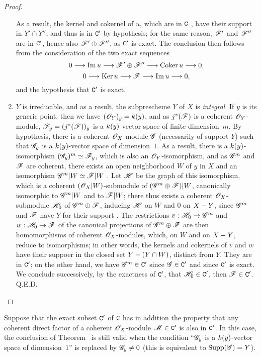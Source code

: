 \begin{proof}
\begin{enumerate}[label=(\alph*)]
    As a result, the kernel and cokernel of $u$, which are in $\mathtt{C}$ , have their support in $Y'\cap Y''$, and thus is in $\mathtt{C}'$ by hypothesis; for the same reason, $\mathscr{F}'$ and $\mathscr{F}''$ are in $\mathtt{C}'$, hence also $\mathscr{F}'\oplus\mathscr{F}''$, as $\mathtt{C}'$ is exact.
    The conclusion then follows from the consideration of the two exact sequences
    \[
      0\to\Im u\to\sh{F}'\oplus\sh{F}''\to\Coker u\to 0,
    \]
    \[
      0\to\Ker u\to\sh{F}\to\Im u\to 0,
    \]
    and the hypothesis that $\mathtt{C}'$ is exact.
  \item $Y$ is irreducible, and as a result, the subprescheme $Y$ of $X$ is \emph{integral}.
    If $y$ is its generic point, then we have $(\mathscr{O}_Y)_y=k(y)$, and as $j^*(\mathscr{F})$ is a coherent $\mathscr{O}_Y$-module, $\mathscr{F}_y=(j^*(\mathscr{F}))_y$ is a $k(y)$-vector space of finite dimension~$m$.
    By hypothesis, there is a coherent $\mathscr{O}_X$-module $\mathscr{G}$ (necessarily of support $Y$) such that $\mathscr{G}_y$ is a $k(y)$-vector space of dimension~$1$.
    As a result, there is a $k(y)$-isomorphism $(\mathscr{G}_y)^m\simeq\mathscr{F}_y$, which is also an $\mathscr{O}_Y$-isomorphism, and as $\mathscr{G}^m$ and $\mathscr{F}$ are coherent, there exists an open neighborhood $W$ of $y$ in $X$ and an isomorphism $\mathscr{G}^m|W\simeq\mathscr{F}|W$ .
    Let $\mathscr{H}$ be the graph of this isomorphism, which is a coherent $(\mathscr{O}_X|W)$-submodule of $(\mathscr{G}^m\oplus\mathscr{F})|W$, canonically isomorphic to $\mathscr{G}^m|W$ and to $\mathscr{F}|W$; there thus exists a coherent $\mathscr{O}_X$-submodule $\mathscr{H}_0$ of $\mathscr{G}^m\oplus\mathscr{F}$, inducing $\mathscr{H}$ on $W$ and $0$ on $X- Y$, since $\mathscr{G}^m$ and $\mathscr{F}$ have $Y$ for their support .
    The restrictions $v:\sh{H}_0\to\sh{G}^m$ and $w:\sh{H}_0\to\sh{F}$ of the canonical projections of $\mathscr{G}^m\oplus\mathscr{F}$ are then homomorphisms of coherent $\mathscr{O}_X$-modules, which, on $W$ and on $X- Y$, reduce to isomorphisms; in other words, the kernels and cokernels of $v$ and $w$ have their suppoer in the closed set $Y-(Y\cap W)$, distinct from $Y$.
    They are in $\mathtt{C}'$; on the other hand, we have $\mathscr{G}^m\in\mathtt{C}'$ since $\mathscr{G}\in\mathtt{C}'$ and since $\mathtt{C}'$ is exact.
    We conclude successively, by the exactness of $\mathtt{C}'$, that $\mathscr{H}_0\in\mathtt{C}'$, then $\mathscr{F}\in\mathtt{C}'$.
Q.E.D.
\end{enumerate}
\end{proof}

\begin{cor}[3.1.3]
\label{3.3.1.3}
Suppose that the exact subset $\mathtt{C}'$ of $\mathtt{C}$ has in addition the property that any coherent direct factor of a coherent $\mathscr{O}_X$-module $\mathscr{M}\in\mathtt{C}'$ is also in $\mathtt{C}'$.
In this case, the conclusion of Theorem~ is still valid when the condition ``$\mathscr{G}_y$ is a $k(y)$-vector space of dimension~$1$'' is replaced by $\mathscr{G}_y\neq 0$ (this is equivalent to ${\mathop{\mathrm{Supp}}\nolimits}(\mathscr{G})=Y$).
\end{cor}

